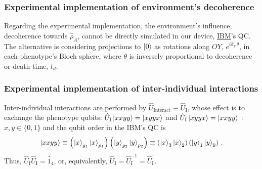 \documentclass[11pt]{article}
\numberwithin{equation}{section} %
\numberwithin{figure}{section} %
\begin{document}
\subsubsection{Experimental implementation of environment's decoherence} \label{experimental_implementation_decoherence}

Regarding the experimental implementation, the environment's influence, decoherence towards $\hat{\rho}_A$, cannot be directly simulated in our device, \href{https://quantumexperience.ng.bluemix.net/qx/editor}{IBM}'s QC. The alternative is considering projections to $\ket{0}$ as rotations along $OY$, $e^{i\hat{\sigma}_y\,\theta}$, \cite[p.~2, l.~37-40]{QAL_IBM} in each phenotype's Bloch sphere, where $\theta$ is inversely proportional to decoherence or death time, $t_d$. 

\subsubsection{Experimental implementation of inter-individual interactions} \label{experimental_implementation_interindividual}

Inter-individual interactions are performed by $\hat{U}_{\textrm{Interact}}\equiv \hat{U}_{\textrm{I}}$, whose effect is to exchange the phenotype qubits:  $\hat{U}_{\textrm{I}}\ket{xxyy}=\ket{xyyx}$ and $\hat{U}_{\textrm{I}}\ket{xyyx}=\ket{xxyy}$ $:$ $x,y\in\{0,1\}$ and the qubit order in the IBM's QC is 
\begin{equation}  \label{qubit_order}
\ket{xxyy}\equiv \left(\ket{x}_{g_1}\ket{x}_{p_1}\right)  \left(\ket{y}_{g_2}\ket{y}_{p_2}\right)\equiv \left(\ket{x}_3\ket{x}_2\right)\left(\ket{y}_1\ket{y}_0\right)\,\textrm{.}
\end{equation}
Thus, $\hat{U}_{\textrm{I}}\hat{U}_{\textrm{I}}=\hat{1}_4$, or, equivalently, $\hat{U}_{\textrm{I}}=\hat{U}_{\textrm{I}}^{-1}=\hat{U}_{\textrm{I}}^\dagger$.
\end{document}
